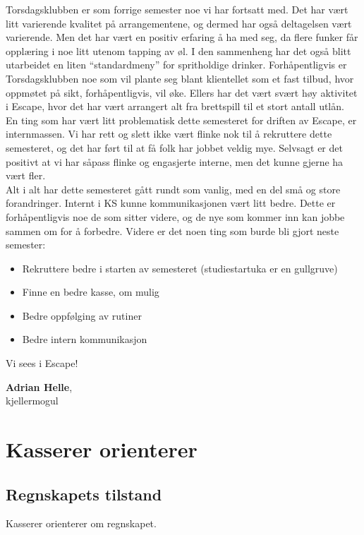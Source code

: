 \documentclass[10pt,norsk,a4paper]{article}
\begin{document}
\begin{multicols}{2}
Torsdagsklubben er som forrige semester noe vi har fortsatt med. Det har vært litt varierende kvalitet på arrangementene, og dermed har også deltagelsen vært varierende. Men det har vært en positiv erfaring å ha med seg, da flere funker får opplæring i noe litt utenom tapping av øl. I den sammenheng har det også blitt utarbeidet en liten “standardmeny” for spritholdige drinker. Forhåpentligvis er Torsdagsklubben noe som vil plante seg blant klientellet som et fast tilbud, hvor oppmøtet på sikt, forhåpentligvis, vil øke. Ellers har det vært svært høy aktivitet i Escape, hvor det har vært arrangert alt fra brettspill til et stort antall utlån.\\

En ting som har vært litt problematisk dette semesteret for driften av Escape, er internmassen. Vi har rett og slett ikke vært flinke nok til å rekruttere dette semesteret, og det har ført til at få folk har jobbet veldig mye. Selvsagt er det positivt at vi har såpass flinke og engasjerte interne, men det kunne gjerne ha vært fler.\\

Alt i alt har dette semesteret gått rundt som vanlig, med en del små og store forandringer. Internt i KS kunne kommunikasjonen vært litt bedre. Dette er forhåpentligvis noe de som sitter videre, og de nye som kommer inn kan jobbe sammen om for å forbedre. Videre er det noen ting som burde bli gjort neste semester:\\
\begin{itemize}
		\item Rekruttere bedre i starten av semesteret (studiestartuka er en gullgruve)
		\item Finne en bedre kasse, om mulig
		\item Bedre oppfølging av rutiner
		\item Bedre intern kommunikasjon
\end{itemize}
\end{multicols}
Vi sees i Escape!

\textbf{Adrian Helle}, \\
kjellermogul \\
\date{24.\ april 2018}


\section{Kasserer orienterer}
\subsection{Regnskapets tilstand}
Kasserer orienterer om regnskapet.
\end{document}
